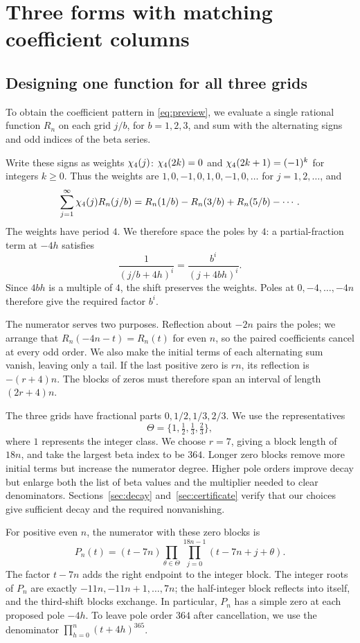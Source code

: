 \section{Three forms with matching coefficient columns}\label{sec:forms}

\subsection{Designing one function for all three grids}

To obtain the coefficient pattern in \eqref{eq:preview}, we evaluate
a single rational function $R_n$ on each grid $j/b$, for $b=1,2,3$,
and sum with the alternating signs and odd indices of the beta series.

Write these signs as weights $\chi_4(j)$:
$\chi_4(2k)=0$ and $\chi_4(2k+1)=(-1)^k$ for integers $k\geq0$.
Thus the weights are $1,0,-1,0,1,0,-1,0,\ldots$ for $j=1,2,\ldots$,
and
\[
 \sum_{j=1}^{\infty}\chi_4(j)R_n(j/b)
   =R_n(1/b)-R_n(3/b)+R_n(5/b)-\cdots.
\]
The weights have period $4$. We therefore space the poles by $4$:
a partial-fraction term at $-4h$ satisfies
\[
 \frac{1}{(j/b+4h)^i}=\frac{b^i}{(j+4bh)^i}.
\]
Since $4bh$ is a multiple of $4$, the shift preserves the weights.
Poles at $0,-4,\ldots,-4n$ therefore give the required factor $b^i$.

The numerator serves two purposes. Reflection about $-2n$ pairs the
poles; we arrange that $R_n(-4n-t)=R_n(t)$ for even $n$, so the paired
coefficients cancel at every odd order. We also make the initial terms
of each alternating sum vanish, leaving only a tail. If the last
positive zero is $rn$, its reflection is $-(r+4)n$. The blocks of zeros
must therefore span an interval of length $(2r+4)n$.

The three grids have fractional parts $0,1/2,1/3,2/3$.
We use the representatives
\[
 \Theta=\{1,\tfrac12,\tfrac13,\tfrac23\},
\]
where $1$ represents the integer class. We choose $r=7$, giving a block
length of $18n$, and take the largest beta index to be $364$.
Longer zero blocks remove more initial terms but increase the numerator
degree. Higher pole orders improve decay but enlarge both the list of
beta values and the multiplier needed to clear denominators.
Sections~\ref{sec:decay} and~\ref{sec:certificate} verify that our
choices give sufficient decay and the required nonvanishing.

For positive even $n$, the numerator with these zero blocks is
\begin{equation}
 P_n(t)=(t-7n)\prod_{\theta\in\Theta}\prod_{j=0}^{18n-1}
                         (t-7n+j+\theta).\label{eq:pn}
\end{equation}
The factor $t-7n$ adds the right endpoint to the integer block.
The integer roots of $P_n$ are exactly $-11n,-11n+1,\ldots,7n$;
the half-integer block reflects into itself, and the third-shift blocks
exchange. In particular, $P_n$ has a simple zero at each proposed
pole $-4h$. To leave pole order $364$ after cancellation, we use
the denominator $\prod_{h=0}^n(t+4h)^{365}$.

